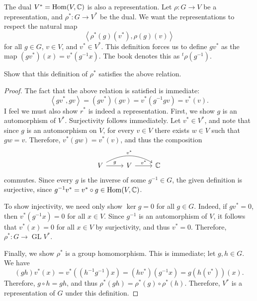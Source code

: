 The dual $V^*=\operatorname{Hom}(V, \mathbb{C} ) $ is also a representation. Let $\rho : G \to V$ be a representation, and $\rho ^*: G \to V^*$ be the dual. We want the representations to respect the natural map
\[
	\left\langle \rho ^*(g)(v^*),\rho (g)(v) \right\rangle 
\]
for all $g\in G$, $v\in V$, and $v^*\in V^*$. This definition forces us to define $gv^*$ as the map $(gv^*)(x)=v^*(g^{-1} x)$. The book denotes this as $^t\rho (g^{-1} )$.
\begin{exercise}
	Show that this definition of $\rho ^*$ satisfies the above relation.
\end{exercise}
\begin{proof}
	The fact that the above relation is satisfied is immediate:
	\[
		\left\langle gv^*,gv \right\rangle =(gv^*)(gv)=v^*(g^{-1} gv)=v^*(v)
	.\]
	I feel we must also show $r^*$ is indeed a representation. First, we show $g$ is an automorphism of $V^*$. Surjectivity follows immediately. Let $v^*\in V^*$, and note that since $g$ is an automorphism on $V$, for every $v\in V$ there exists $w\in V$ such that $gw=v$. Therefore, $v^*(gw)=v^*(v)$, and thus the composition
	\[\begin{tikzcd}[row sep = 2.5em, column sep = 2.5em]
		V\arrow[r, "g"]\arrow[rr, bend left, "v^*"]&V\arrow[r, "v^*"]&\mathbb{C} 
	\end{tikzcd}\]
	commutes. Since every $g$ is the inverse of some $g^{-1} \in G$, the given definition is surjective, since $g^{-1} v^*=v^*\circ g\in \operatorname{Hom}(V, \mathbb{C} ) $.

	To show injectivity, we need only show $\ker g=0$ for all $g\in G$. Indeed, if $gv^*=0$, then $v^*(g^{-1} x)=0$ for all $x\in V$. Since $g^{-1} $ is an automorphism of $V$, it follows that $v^*(x)=0$ for all $x\in V$ by surjectivity, and thus $v^*=0$. Therefore, $\rho ^*: G \to \operatorname{GL} V^*$.

	Finally, we show $\rho ^*$ is a group homomorphism. This is immediate; let $g,h\in G$. We have
	\[
		(gh)v^*(x)=v^*\left(\left( h^{-1} g^{-1}   \right) x\right)=(hv^*)\left( g^{-1} x \right) =g(h(v^*))(x)
	.\]
	Therefore, $g\circ h=gh$, and thus $\rho ^*(gh)=\rho ^*(g)\circ \rho ^*(h)$. Therefore, $V^*$ is a representation of $G$ under this definition.
\end{proof}

